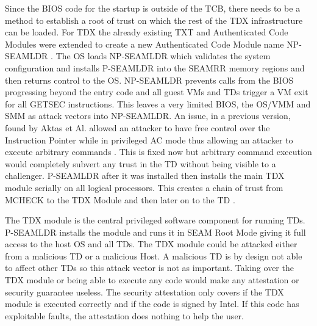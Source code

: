 
Since the BIOS code for the startup is outside of the \gls{TCB}, there needs to be a method to establish a root of trust on which the rest of the TDX infrastructure can be loaded. For TDX the already existing TXT and Authenticated Code Modules were extended to create a new Authenticated Code Module name \Gls{NP-SEAMLDR} \cite{TXT}. The OS loads \Gls{NP-SEAMLDR} which validates the system configuration and installs \Gls{P-SEAMLDR} into the \Gls{SEAMRR} memory regions and then returns control to the OS. \Gls{NP-SEAMLDR} prevents calls from the BIOS progressing beyond the entry code and all guest VMs and TDs trigger a VM exit for all \Gls{GETSEC} instructions. This leaves a very limited BIOS, the OS/VMM and SMM as attack vectors into \Gls{NP-SEAMLDR}. An issue, in a previous version, found by Aktas et Al. allowed an attacker to have free control over the Instruction Pointer while in privileged AC mode thus allowing an attacker to execute arbitrary commands \cite{aktas_intel_nodate}. This is fixed now but arbitrary command execution would completely subvert any trust in the \Gls{TD} without being visible to a challenger. \Gls{P-SEAMLDR} after it was installed then installs the main TDX module serially on all logical processors. This creates a chain of trust from MCHECK to the TDX Module and then later on to the TD \cite{SEAM}. 


The TDX module is the central privileged software component for running TDs. \Gls{P-SEAMLDR} installs the module and runs it in SEAM Root Mode giving it full access to the host OS and all TDs. The TDX module could be attacked either from a malicious TD or a malicious Host. A malicious TD is by design not able to affect other TDs so this attack vector is not as important. Taking over the TDX module or being able to execute any code would make any attestation or security guarantee useless. The security attestation only covers if the TDX module is executed correctly and if the code is signed by Intel. If this code has exploitable faults, the attestation does nothing to help the user.


